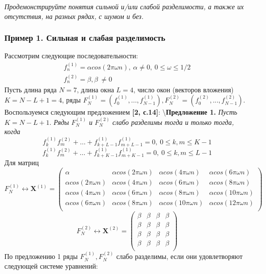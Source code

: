 \documentclass[
]{article}
\begin{document}
\textit{Продемонстрируйте понятия сильной и/или слабой разделимости, а также их отсутствия, на разных рядах, с шумом и без.}

\subsubsection{Пример 1. Сильная и слабая разделимость}

Рассмотрим следующие последовательности: \begin{align}
    f^{(1)}_n = \alpha cos(2\pi \omega n ), \ \alpha \not= 0, \ 0 \leq \omega \leq 1/2\tag{*} \\
    f^{(2)}_n = \beta, \beta \ \not= 0 \tag{**}
\end{align} Пусть длина ряда \(N = 7\), длина окна \(L = 4\), число окон
(векторов вложения) \(K = N - L + 1 = 4\), ряды
\(F_N^{(1)} = (f_0^{(1)}, ..., f_{N-1}^{(1)}), F_N^{(2)} = (f_0^{(2)}, ..., f_{N-1}^{(2)})\).
Воспользуемся следующим предложением \textbf{[2, с.14]}:
\textbackslash{}\redline \textbf{Предложение 1.}
\textit{ Пусть }\(K = N-L+1.\) \textit{Ряды }\(F_N^{(1)}\) \textit{ и }
\(F_N^{(2)}\) \textit{ слабо разделимы тогда и только тогда, когда}
\[f_k^{(1)}f_m^{(2)} +\dots+f^{(1)}_{k+L-1}f^{(1)}_{m+L-1} = 0, \ 0 \leq k, m \leq K-1\]
\[f_k^{(1)}f_m^{(2)} +\dots+f^{(1)}_{k+K-1}f^{(1)}_{m+K-1} = 0, \ 0 \leq k, m \leq L-1\]
Для матриц \[F^{(1)}_N \longleftrightarrow \textbf{X}^{(1)} = 
\begin{pmatrix}
    \alpha & \alpha cos(2\pi \omega n) & \alpha cos(4\pi \omega n) & \alpha cos(6\pi \omega n) \\
    \alpha cos(2\pi \omega n) & \alpha cos(4\pi \omega n) & \alpha cos(6\pi \omega n) & \alpha cos(8\pi \omega n) \\
    \alpha cos(4\pi \omega n) & \alpha cos(6\pi \omega n) & \alpha cos(8\pi \omega n) & \alpha cos(10\pi \omega n) \\
    \alpha cos(6\pi \omega n) & \alpha cos(8\pi \omega n) & \alpha cos(10\pi \omega n) & \alpha cos(12\pi \omega n) \\
\end{pmatrix}
\] \[
    F^{(2)}_N \longleftrightarrow \textbf{X}^{(2)} = 
\begin{pmatrix}
    \beta & \beta & \beta & \beta \\
    \beta & \beta & \beta & \beta \\
    \beta & \beta & \beta & \beta \\
    \beta & \beta & \beta & \beta \\
\end{pmatrix}
\] По предложению 1 ряды \(F_N^{(1)}, F_N^{(2)}\) слабо разделимы, если
они удовлетворяют следующей системе уравнений:
\end{document}

